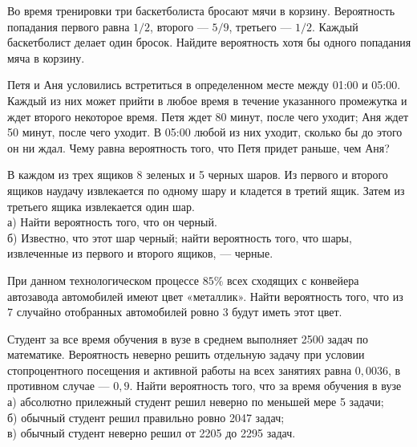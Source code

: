 \newpage\setcounter{zad}{0}



\begin{zkrW}{20}\noindent 
	Во время тренировки три баскетболиста бросают мячи в корзину. Вероятность попадания первого равна $1/2$, второго --- $5/9$, третьего --- $1/2$. Каждый баскетболист делает один бросок. Найдите вероятность хотя бы одного попадания мяча в корзину.
 
\end{zkrW}

\begin{zkrW}{20}\noindent 
	Петя и Аня условились встретиться в определенном месте между 01:00 и 05:00. Каждый из них может прийти в любое время в течение указанного промежутка и ждет второго некоторое время. Петя ждет 80 минут, после чего уходит; Аня ждет 50 минут, после чего уходит. В 05:00 любой из них уходит, сколько бы до этого он ни ждал. Чему равна вероятность того, что Петя придет раньше, чем Аня?
 
\end{zkrW}

\begin{zkrW}{20}\noindent 
	В каждом из трех ящиков 8 зеленых и 5 черных шаров. Из первого и второго ящиков наудачу извлекается по одному шару и кладется в третий ящик. Затем из третьего ящика извлекается один шар. \\ \indent а) Найти вероятность того, что он черный. \\ \indent б) Известно, что этот шар черный; найти вероятность того, что шары, извлеченные из первого и второго ящиков, --- черные.
 
\end{zkrW}

\begin{zkrW}{20}\noindent 
	При данном технологическом процессе $85\%$ всех сходящих с конвейера автозавода автомобилей имеют цвет «металлик». Найти вероятность того, что из 7 случайно отобранных автомобилей ровно 3 будут иметь этот цвет.
 
\end{zkrW}

\begin{zkrW}{20}\noindent 
	Студент за все время обучения в вузе в среднем выполняет 2500 задач по математике. Вероятность неверно решить отдельную задачу при условии стопроцентного посещения и активной работы на всех занятиях равна $0{,}0036$, в противном случае --- $0{,}9$. Найти вероятность того, что за время обучения в вузе \\ \indent а) абсолютно прилежный студент решил неверно по меньшей мере 5 задачи; \\ \indent б) обычный студент решил правильно ровно 2047 задач; \\ \indent в) обычный студент неверно решил от 2205 до 2295 задач.
 
\end{zkrW}

